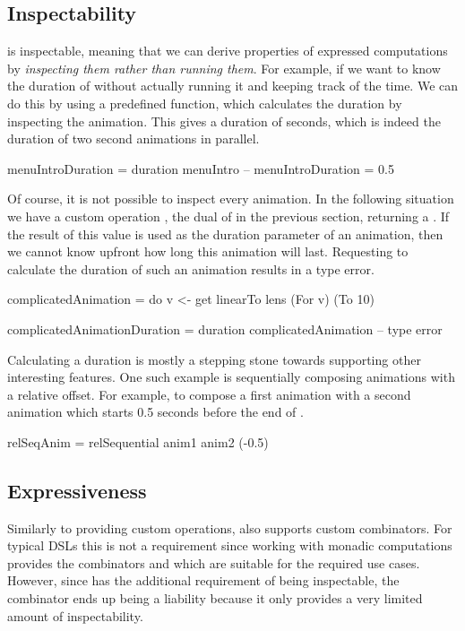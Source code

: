 \subsection{Inspectability}

\dsl{} is inspectable, meaning that we can derive properties of expressed computations by \emph{inspecting them rather than running them}. For example, if we want to know the duration of  without actually running it and keeping track of the time. We can do this by using a predefined  function, which calculates the duration by inspecting the animation. This gives a duration of  seconds, which is indeed the duration of two  second animations in parallel.

\begin{spec}
menuIntroDuration = duration menuIntro
-- menuIntroDuration = 0.5 
\end{spec}

Of course, it is not possible to inspect every animation. In the following situation we have a custom operation , the dual of  in the previous section, returning a . If the result of this value is used as the duration parameter of an animation, then we cannot know upfront how long this animation will last. Requesting to calculate the duration of such an animation results in a type error.

\begin{spec}
complicatedAnimation = do
  v <- get
  linearTo lens (For v) (To 10)

complicatedAnimationDuration = duration complicatedAnimation
-- type error
\end{spec}

Calculating a duration is mostly a stepping stone towards supporting other interesting features. One such example is sequentially composing animations with a relative offset. For example, to compose a first animation  with a second animation  which starts 0.5 seconds before the end of .

\begin{spec}
relSeqAnim = relSequential anim1 anim2 (-0.5)
\end{spec}

\subsection{Expressiveness}
\label{sec:customcomb}

Similarly to providing custom operations, \dsl{} also supports custom combinators. For typical DSLs this is not a requirement since working with monadic computations provides the combinators \hs{>>=} and  which are suitable for the required use cases. However, since \dsl{} has the additional requirement of being inspectable, the \hs{>>=} combinator ends up being a liability because it only provides a very limited amount of inspectability.

